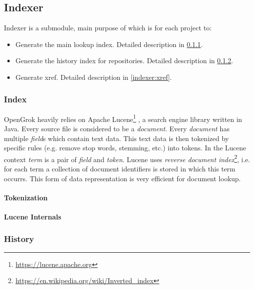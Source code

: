 \subsection{Indexer}
\label{indexer}

Indexer is a submodule, main purpose of which is for each project to:
\begin{itemize}
    \item Generate the main lookup index. Detailed description in \ref{indexer:index}.
    \item Generate the history index for repositories. Detailed description in \ref{indexer:history}.
    \item Generate xref. Detailed description in \ref{indexer:xref}.
\end{itemize}

\subsubsection{Index}
\label{indexer:index}

OpenGrok heavily relies on Apache Lucene\footnote{\url{https://lucene.apache.org}} \citep{lucene_in_action}, a search engine library
written in Java. Every source file is considered to be a \textit{document}. Every \textit{document} has multiple
\textit{field}s which contain text data. This text data is then tokenized by specific rules (e.g. remove stop words,
stemming, etc.) into tokens. In the Lucene context \textit{term} is a pair of \textit{field} and \textit{token}.
Lucene uses \textit{reverse document index}\footnote{\url{https://en.wikipedia.org/wiki/Inverted_index}},
i.e. for each term a collection of document identifiers is stored in which this term occurrs.
This form of data representation is very efficient for document lookup.

\paragraph{Tokenization}

\paragraph{Lucene Internals}

\subsubsection{History}
\label{indexer:history}

